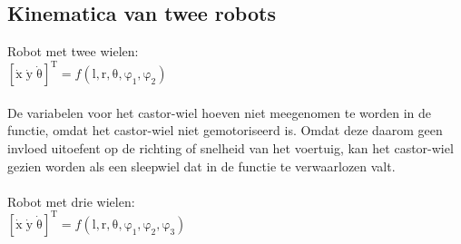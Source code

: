 \documentclass[a4paper]{article}
\begin{document}
\subsection{Kinematica van twee robots}
Robot met twee wielen:\\
$\mathrm{[\dot{x}\; \dot{y}\; \dot{\theta}]^T} = f\mathrm{(l, r, \theta, \varphi_{1}, \varphi_{2})}$\\
\\
De variabelen voor het castor-wiel hoeven niet meegenomen te worden in de functie, omdat het castor-wiel niet gemotoriseerd is. Omdat deze daarom geen invloed uitoefent op de richting of snelheid van het voertuig, kan het castor-wiel gezien worden als een sleepwiel dat in de functie te verwaarlozen valt.\\\\
Robot met drie wielen:\\
$\mathrm{[\dot{x}\; \dot{y}\; \dot{\theta}]^T} = f\mathrm{(l, r, \theta, \varphi_{1}, \varphi_{2}, \varphi_{3})}$\\
\end{document}
